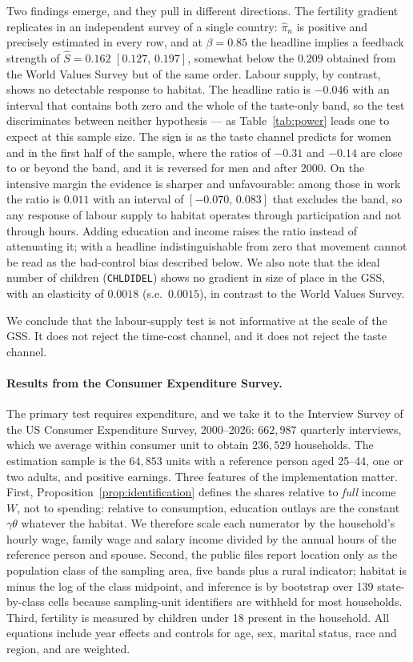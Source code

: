 \documentclass[11pt]{article}
\begin{document}
Two findings emerge, and they pull in different directions. The fertility gradient replicates in
an independent survey of a single country: $\hat\pi_n$ is positive and precisely estimated in every
row, and at $\beta=0.85$ the headline implies a feedback strength of $\hat S=0.162$
$[0.127,\,0.197]$, somewhat below the $0.209$ obtained from the World Values Survey but of the same
order. Labour supply, by contrast, shows no detectable response to habitat. The headline ratio is
$-0.046$ with an interval that contains both zero and the whole of the taste-only band, so the test
discriminates between neither hypothesis --- as Table~\ref{tab:power} leads one to expect at this
sample size. The sign is as the taste channel predicts for women and in the first half of the
sample, where the ratios of $-0.31$ and $-0.14$ are close to or beyond the band, and it is reversed
for men and after 2000. On the intensive margin the evidence is sharper and unfavourable: among
those in work the ratio is $0.011$ with an interval of $[-0.070,\,0.083]$ that excludes the band,
so any response of labour supply to habitat operates through participation and not through hours.
Adding education and income raises the ratio instead of attenuating it; with a headline
indistinguishable from zero that movement cannot be read as the bad-control bias described below.
We also note that the ideal number of children (\texttt{CHLDIDEL}) shows no gradient in size of
place in the GSS, with an elasticity of $0.0018$ (s.e.\ $0.0015$), in contrast to the World Values
Survey.

We conclude that the labour-supply test is not informative at the scale of the GSS. It does not
reject the time-cost channel, and it does not reject the taste channel.

\paragraph{Results from the Consumer Expenditure Survey.}
The primary test requires expenditure, and we take it to the Interview Survey of the US Consumer
Expenditure Survey, 2000--2026: $662{,}987$ quarterly interviews, which we average within consumer
unit to obtain $236{,}529$ households. The estimation sample is the $64{,}853$ units with a
reference person aged 25--44, one or two adults, and positive earnings. Three features of the
implementation matter. First, Proposition~\ref{prop:identification} defines the shares relative to
\emph{full} income $W$, not to spending: relative to consumption, education outlays are the
constant $\gamma\theta$ whatever the habitat. We therefore scale each numerator by the household's
hourly wage, family wage and salary income divided by the annual hours of the reference person and
spouse. Second, the public files report location only as the population class of the sampling
area, five bands plus a rural indicator; habitat is minus the log of the class midpoint, and
inference is by bootstrap over 139 state-by-class cells because sampling-unit identifiers are
withheld for most households. Third, fertility is measured by children under 18 present in the
household. All equations include year effects and controls for age, sex, marital status, race and
region, and are weighted.
\end{document}
